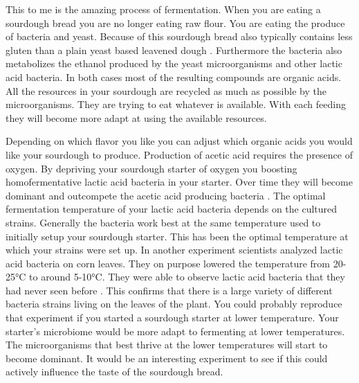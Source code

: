 This to me is the amazing process of fermentation.
When you are eating a sourdough bread you are no longer eating raw flour.
You are eating the produce of bacteria and yeast. Because of this sourdough
bread also typically
contains less gluten than a plain yeast based leavened dough
\cite{proteolysis+sourdough+bacteria}. Furthermore the bacteria
also metabolizes the ethanol produced by the yeast microorganisms and other
lactic acid bacteria. In both cases most of the resulting compounds
are organic acids. All the resources in your sourdough are recycled
as much as possible by the microorganisms. They are trying to eat whatever
is available. With each feeding they will become more adapt at using
the available resources.

Depending on which flavor you like you can adjust which organic acids
you would like your sourdough to produce. Production of acetic acid
requires the presence of oxygen. By depriving your sourdough starter
of oxygen you boosting homofermentative lactic acid bacteria in your
starter. Over time they will become dominant and outcompete the acetic acid
producing bacteria \cite{acetic+acid+oxygen}. The optimal fermentation temperature of your
lactic acid bacteria depends on the cultured strains. Generally the bacteria
work best at the same temperature used to initially setup your sourdough
starter. This has been the optimal temperature at which your strains
were set up. In another experiment scientists analyzed lactic acid bacteria
on corn leaves. They on purpose lowered the temperature from 20-25°C to around 5-10°C.
They were able to observe lactic acid bacteria that they had never seen
before \cite{temperature+bacteria+corn}. This confirms that there is a
large variety of different bacteria
strains living on the leaves of the plant. You could probably reproduce
that experiment if you started a sourdough starter at lower temperature.
Your starter's microbiome would be more adapt to fermenting at lower
temperatures. The microorganisms that best thrive at the lower temperatures
will start to become dominant. It would be an interesting experiment
to see if this could actively influence the taste of the sourdough
bread.
